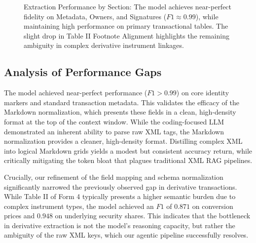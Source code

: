 \documentclass[journal, onecolumn]{IEEEtran}
\begin{document}
\begin{figure}[h]
\centering
{}
\caption{Extraction Performance by Section: The model achieves near-perfect fidelity on Metadata, Owners, and Signatures ($F1 \approx 0.99$), while maintaining high performance on primary transactional tables. The slight drop in Table II Footnote Alignment highlights the remaining ambiguity in complex derivative instrument linkages.}
\label{fig:sectional_f1}
\end{figure}

\subsection{Analysis of Performance Gaps}
The model achieved near-perfect performance ($F1 > 0.99$) on core identity markers and standard transaction metadata. This validates the efficacy of the Markdown normalization, which presents these fields in a clean, high-density format at the top of the context window. While the coding-focused LLM demonstrated an inherent ability to parse raw XML tags, the Markdown normalization provides a cleaner, high-density format. Distilling complex XML into logical Markdown grids yields a modest but consistent accuracy return, while critically mitigating the token bloat that plagues traditional XML RAG pipelines.

Crucially, our refinement of the field mapping and schema normalization significantly narrowed the previously observed gap in derivative transactions. While Table II of Form 4 typically presents a higher semantic burden due to complex instrument types, the model achieved an $F1$ of $0.871$ on conversion prices and $0.948$ on underlying security shares. This indicates that the bottleneck in derivative extraction is not the model's reasoning capacity, but rather the ambiguity of the raw XML keys, which our agentic pipeline successfully resolves.
\end{document}
